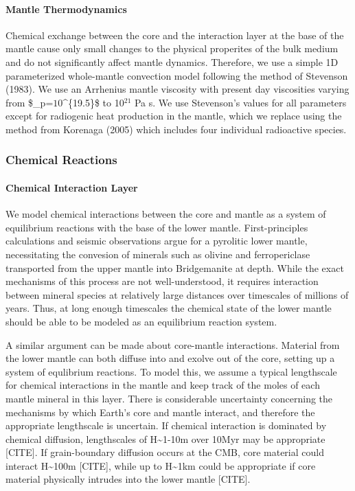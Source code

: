 \documentclass[]{article}
\let\oldparagraph\paragraph
\renewcommand{\paragraph}[1]{\oldparagraph{#1}\mbox{}}
\begin{document}
\hypertarget{mantle-thermodynamics}{%
\paragraph{Mantle Thermodynamics}\label{mantle-thermodynamics}}

Chemical exchange between the core and the interaction layer at the base
of the mantle cause only small changes to the physical properites of the
bulk medium and do not significantly affect mantle dynamics. Therefore,
we use a simple 1D parameterized whole-mantle convection model following
the method of Stevenson (1983). We use an Arrhenius mantle viscosity
with present day viscosities varying from \$\mu\_p=\(10\)\^{}\{19.5\}\$
to 10\(^{21}\) Pa s. We use Stevenson's values for all parameters except
for radiogenic heat production in the mantle, which we replace using the
method from Korenaga (2005) which includes four individual radioactive
species.

\hypertarget{chemical-reactions}{%
\subsubsection{Chemical Reactions}\label{chemical-reactions}}

\hypertarget{chemical-interaction-layer}{%
\paragraph{Chemical Interaction
Layer}\label{chemical-interaction-layer}}

We model chemical interactions between the core and mantle as a system
of equilibrium reactions with the base of the lower mantle.
First-principles calculations and seismic observations argue for a
pyrolitic lower mantle, necessitating the convesion of minerals such as
olivine and ferropericlase transported from the upper mantle into
Bridgemanite at depth. While the exact mechanisms of this process are
not well-understood, it requires interaction between mineral species at
relatively large distances over timescales of millions of years. Thus,
at long enough timescales the chemical state of the lower mantle should
be able to be modeled as an equilibrium reaction system.

A similar argument can be made about core-mantle interactions. Material
from the lower mantle can both diffuse into and exolve out of the core,
setting up a system of equlibrium reactions. To model this, we assume a
typical lengthscale for chemical interactions in the mantle and keep
track of the moles of each mantle mineral in this layer. There is
considerable uncertainty concerning the mechanisms by which Earth's core
and mantle interact, and therefore the appropriate lengthscale is
uncertain. If chemical interaction is dominated by chemical diffusion,
lengthscales of H\textasciitilde{}1-10m over 10Myr may be appropriate
{[}CITE{]}. If grain-boundary diffusion occurs at the CMB, core material
could interact H\textasciitilde{}100m {[}CITE{]}, while up to
H\textasciitilde{}1km could be appropriate if core material physically
intrudes into the lower mantle {[}CITE{]}.
\end{document}
